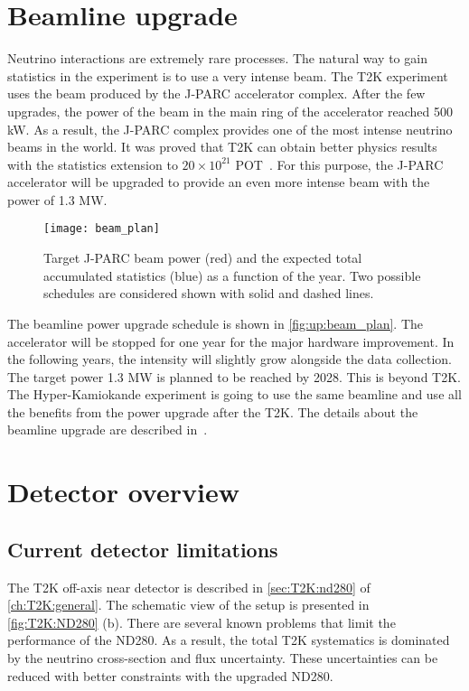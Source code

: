\documentclass[main.tex]{subfiles}
\begin{document}
\section{Beamline upgrade}
\label{sec:up:beam}
Neutrino interactions are extremely rare processes. The natural way to gain statistics in the experiment is to use a very intense beam. The T2K experiment uses the beam produced by the J-PARC accelerator complex. After the few upgrades, the power of the beam in the main ring of the accelerator reached 500 kW. As a result, the J-PARC complex provides one of the most intense neutrino beams in the world. It was proved that T2K can obtain better physics results with the statistics extension to $20\times10^{21}$ POT~\cite{Abe2016e}. For this purpose, the J-PARC accelerator will be upgraded to provide an even more intense beam with the power of 1.3 MW.

\begin{figure}[!ht]
  \centering
  \texttt{[image: beam\_plan]}
  \caption{Target J-PARC beam power (red) and the expected total accumulated statistics (blue) as a function of the year. Two possible schedules are considered shown with solid and dashed lines.}
  \label{fig:up:beam_plan}
\end{figure}

The beamline power upgrade schedule is shown in \autoref{fig:up:beam_plan}. The accelerator will be stopped for one year for the major hardware improvement. In the following years, the intensity will slightly grow alongside the data collection. The target power 1.3 MW is planned to be reached by 2028. This is beyond T2K. The Hyper-Kamiokande experiment is going to use the same beamline and use all the benefits from the power upgrade after the T2K. The details about the beamline upgrade are described in~\cite{Abe2019h}.

\section{Detector overview}
\label{sec:up:nd}


\subsection{Current detector limitations}
The T2K off-axis near detector is described in \autoref{sec:T2K:nd280} of \autoref{ch:T2K:general}. The schematic view of the setup is presented in \autoref{fig:T2K:ND280} (b). There are several known problems that limit the performance of the ND280. As a result, the total T2K systematics is dominated by the neutrino cross-section and flux uncertainty. These uncertainties can be reduced with better constraints with the upgraded ND280.
\end{document}
